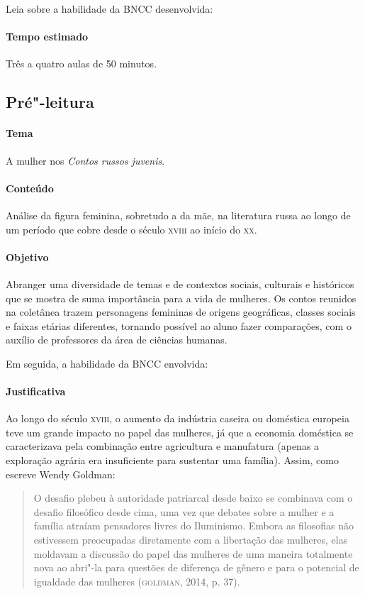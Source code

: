 \documentclass[11pt]{extarticle}
\begin{document}
Leia sobre a habilidade da BNCC desenvolvida:

\paragraph{Tempo estimado} Três a quatro aulas de 50 minutos.



\subsection{Pré"-leitura}

\paragraph{Tema} A mulher nos \emph{Contos russos juvenis}.

\paragraph{Conteúdo}
Análise da figura feminina, sobretudo a da mãe, na literatura russa ao
longo de um período que cobre desde o século \textsc{xviii} ao início do \textsc{xx}.

\paragraph{Objetivo}
Abranger uma diversidade de temas e de contextos sociais, culturais e
históricos que se mostra de suma importância para a vida de mulheres. Os
contos reunidos na coletânea trazem personagens femininas de origens
geográficas, classes sociais e faixas etárias diferentes, tornando
possível ao aluno fazer comparações, com o auxílio de professores da área de ciências humanas.

Em seguida, a habilidade da BNCC envolvida:

\paragraph{Justificativa}
Ao longo do século \textsc{xviii}, o aumento da indústria caseira ou doméstica
europeia teve um grande impacto no papel das mulheres, já que a economia
doméstica se caracterizava pela combinação entre agricultura e
manufatura (apenas a exploração agrária era insuficiente para sustentar
uma família). Assim, como escreve Wendy Goldman:

\begin{quote}
O desafio plebeu à autoridade patriarcal desde baixo se combinava com o
desafio filosófico desde cima, uma vez que debates sobre a mulher e a
família atraíam pensadores livres do Iluminismo. Embora as filosofias
não estivessem preocupadas diretamente com a libertação das mulheres,
elas moldavam a discussão do papel das mulheres de uma maneira
totalmente nova ao abri"-la para questões de diferença de gênero e para o
potencial de igualdade das mulheres (\textsc{goldman}, 2014, p. 37).
\end{quote}
\end{document}
